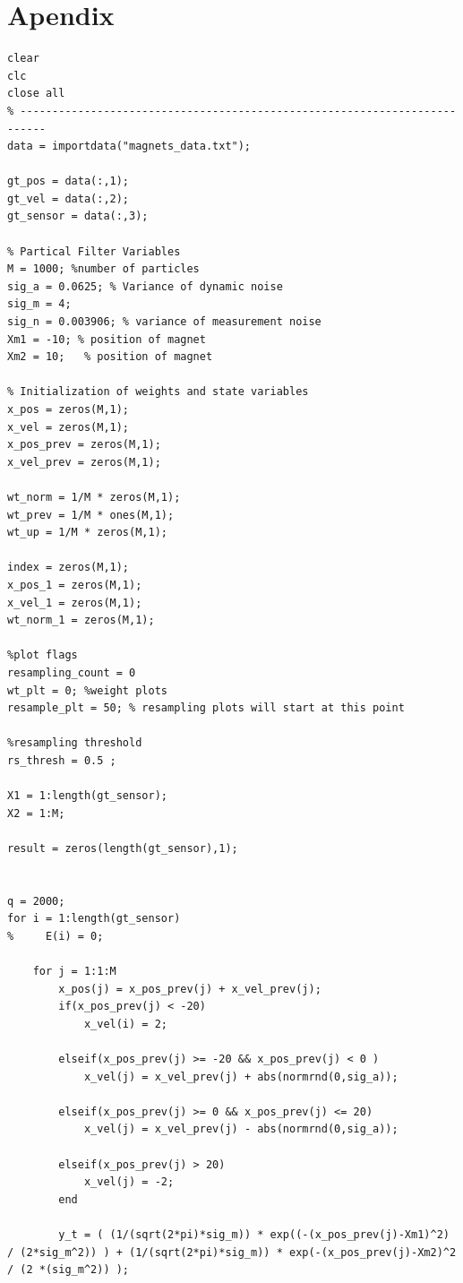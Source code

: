 \documentclass{article}
\begin{document}
\section{Apendix}\label{sec:apdx}
\begin{lstlisting}[frame=single]
clear
clc
close all
% --------------------------------------------------------------------------
data = importdata("magnets_data.txt");

gt_pos = data(:,1);
gt_vel = data(:,2);
gt_sensor = data(:,3);

% Partical Filter Variables
M = 1000; %number of particles
sig_a = 0.0625; % Variance of dynamic noise
sig_m = 4;
sig_n = 0.003906; % variance of measurement noise
Xm1 = -10; % position of magnet
Xm2 = 10;   % position of magnet

% Initialization of weights and state variables
x_pos = zeros(M,1);
x_vel = zeros(M,1);
x_pos_prev = zeros(M,1);
x_vel_prev = zeros(M,1);

wt_norm = 1/M * zeros(M,1);
wt_prev = 1/M * ones(M,1);
wt_up = 1/M * zeros(M,1);

index = zeros(M,1);
x_pos_1 = zeros(M,1);
x_vel_1 = zeros(M,1);
wt_norm_1 = zeros(M,1);

%plot flags
resampling_count = 0
wt_plt = 0; %weight plots
resample_plt = 50; % resampling plots will start at this point

%resampling threshold
rs_thresh = 0.5 ;

X1 = 1:length(gt_sensor);
X2 = 1:M;

result = zeros(length(gt_sensor),1);


q = 2000;
for i = 1:length(gt_sensor)
%     E(i) = 0;

    for j = 1:1:M
        x_pos(j) = x_pos_prev(j) + x_vel_prev(j);
        if(x_pos_prev(j) < -20)
            x_vel(i) = 2;
            
        elseif(x_pos_prev(j) >= -20 && x_pos_prev(j) < 0 )
            x_vel(j) = x_vel_prev(j) + abs(normrnd(0,sig_a));
            
        elseif(x_pos_prev(j) >= 0 && x_pos_prev(j) <= 20)
            x_vel(j) = x_vel_prev(j) - abs(normrnd(0,sig_a));
            
        elseif(x_pos_prev(j) > 20)
            x_vel(j) = -2;
        end
        
        y_t = ( (1/(sqrt(2*pi)*sig_m)) * exp((-(x_pos_prev(j)-Xm1)^2) / (2*sig_m^2)) ) + (1/(sqrt(2*pi)*sig_m)) * exp(-(x_pos_prev(j)-Xm2)^2 / (2 *(sig_m^2)) );
        

\end{lstlisting}
\end{document}
